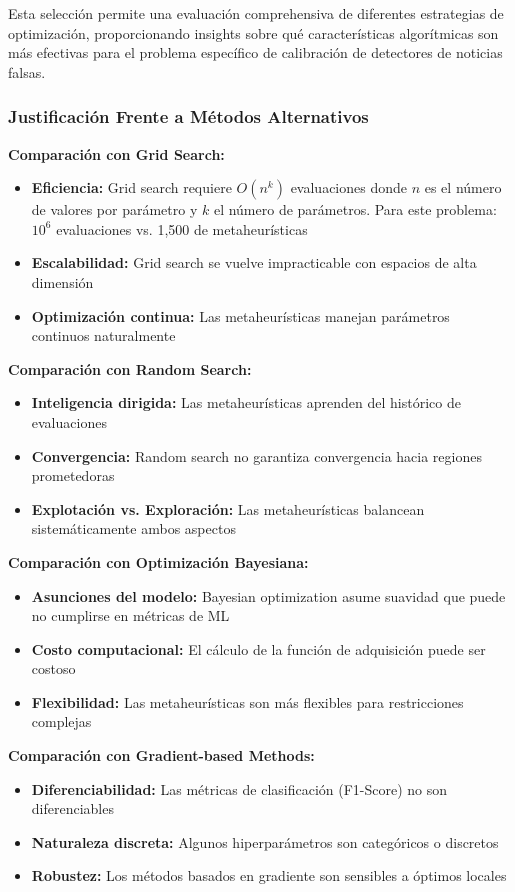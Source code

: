 Esta selección permite una evaluación comprehensiva de diferentes estrategias de optimización, proporcionando insights sobre qué características algorítmicas son más efectivas para el problema específico de calibración de detectores de noticias falsas.

\subsubsection{Justificación Frente a Métodos Alternativos}

\textbf{Comparación con Grid Search:}
\begin{itemize}
    \item \textbf{Eficiencia:} Grid search requiere $O(n^k)$ evaluaciones donde $n$ es el número de valores por parámetro y $k$ el número de parámetros. Para este problema: $10^6$ evaluaciones vs. 1,500 de metaheurísticas
    \item \textbf{Escalabilidad:} Grid search se vuelve impracticable con espacios de alta dimensión
    \item \textbf{Optimización continua:} Las metaheurísticas manejan parámetros continuos naturalmente
\end{itemize}

\textbf{Comparación con Random Search:}
\begin{itemize}
    \item \textbf{Inteligencia dirigida:} Las metaheurísticas aprenden del histórico de evaluaciones
    \item \textbf{Convergencia:} Random search no garantiza convergencia hacia regiones prometedoras
    \item \textbf{Explotación vs. Exploración:} Las metaheurísticas balancean sistemáticamente ambos aspectos
\end{itemize}

\textbf{Comparación con Optimización Bayesiana:}
\begin{itemize}
    \item \textbf{Asunciones del modelo:} Bayesian optimization asume suavidad que puede no cumplirse en métricas de ML
    \item \textbf{Costo computacional:} El cálculo de la función de adquisición puede ser costoso
    \item \textbf{Flexibilidad:} Las metaheurísticas son más flexibles para restricciones complejas
\end{itemize}

\textbf{Comparación con Gradient-based Methods:}
\begin{itemize}
    \item \textbf{Diferenciabilidad:} Las métricas de clasificación (F1-Score) no son diferenciables
    \item \textbf{Naturaleza discreta:} Algunos hiperparámetros son categóricos o discretos
    \item \textbf{Robustez:} Los métodos basados en gradiente son sensibles a óptimos locales
\end{itemize}

